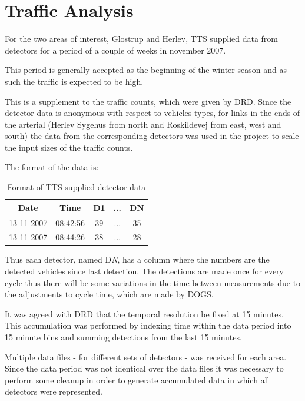 \section{Traffic Analysis}
\label{data}
For the two areas of interest, Glostrup and Herlev, TTS supplied data from detectors for a period of a couple of weeks in november 2007. 

This period is generally accepted as the beginning of the winter season and as such the traffic is expected to be high.

This is a supplement to the traffic counts, which were given by DRD. Since the detector data is anonymous with respect to vehicles types, for links in the ends of the arterial (Herlev Sygehus from north and Roskildevej from east, west and south) the data from the corresponding detectors was used in the project to scale the input sizes of the traffic counts.

The format of the data is:

\begin{table}[!ht]
\begin{center}
\begin{tabular}{c|c|c|c|c}
\textbf{Date} & \textbf{Time} & \textbf{D1} & \textbf{...} & \textbf{DN} \\ \hline
13-11-2007 & 08:42:56 & 39 & ... & 35 \\
13-11-2007 & 08:44:26 & 38 & ...  & 28 \\
\end{tabular}
\end{center}
\caption{Format of TTS supplied detector data}
\label{tab:dataformat}
\end{table}

Thus each detector, named D\textit{N}, has a column where the numbers are the detected vehicles since last detection. The detections are made once for every cycle thus there will be some variations in the time between measurements due to the adjustments to cycle time, which are made by DOGS.

It was agreed with DRD that the temporal resolution be fixed at 15 minutes. This accumulation was performed by indexing time within the data period into 15 minute bins and summing detections from the last 15 minutes.

Multiple data files - for different sets of detectors - was received for each area. Since the data period was not identical over the data files it was necessary to perform some cleanup in order to generate accumulated data in which all detectors were represented.

